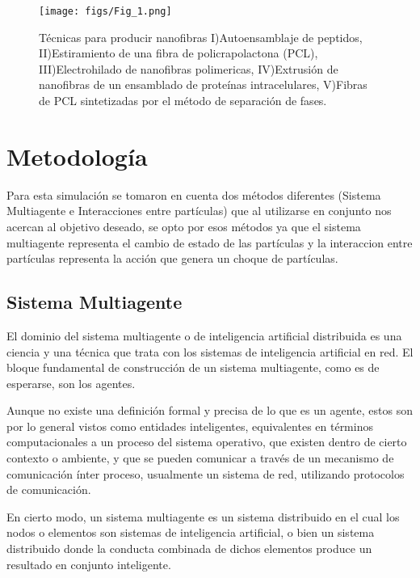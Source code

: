 \documentclass[a4paper,fleqn]{cas-sc}
\begin{document}
\begin{figure}[h]
	\centering
		\texttt{[image: figs/Fig\_1.png]}
	\caption{Técnicas para producir nanofibras I)Autoensamblaje de peptidos, II)Estiramiento de una fibra de policrapolactona (PCL), III)Electrohilado de nanofibras polimericas, IV)Extrusión de nanofibras de un ensamblado de proteínas intracelulares, V)Fibras de PCL sintetizadas por el método de separación de fases.}
	\label{FIG:1}
\end{figure}

\section{Metodología}
Para esta simulación se tomaron en cuenta dos métodos diferentes (Sistema Multiagente e Interacciones entre partículas) que al utilizarse en conjunto nos acercan al objetivo deseado, se opto por esos métodos ya que el sistema multiagente representa el cambio de estado de las partículas y la interaccion entre partículas representa la acción que genera un choque de partículas.

\subsection{Sistema Multiagente}
El dominio del sistema multiagente o de inteligencia artificial distribuida es una ciencia y una técnica que trata con los sistemas de inteligencia artificial en red. El bloque fundamental de construcción de un sistema multiagente, como es de esperarse, son los agentes.

Aunque no existe una definición formal y precisa de lo que es un agente, estos son por lo general vistos como entidades inteligentes, equivalentes en términos computacionales a un proceso del sistema operativo, que existen dentro de cierto contexto o ambiente, y que se pueden comunicar a través de un mecanismo de comunicación ínter proceso, usualmente un sistema de red, utilizando protocolos de comunicación.

En cierto modo, un sistema multiagente es un sistema distribuido en el cual los nodos o elementos son sistemas de inteligencia artificial, o bien un sistema distribuido donde la conducta combinada de dichos elementos produce un resultado en conjunto inteligente.
\end{document}
